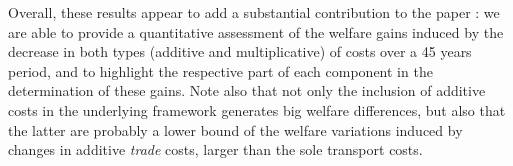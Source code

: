 \documentclass[a4paper,12pt]{article}
\begin{document}
Overall, these results appear to add a substantial contribution to the paper : we are able to provide a quantitative assessment of the welfare gains induced by the decrease in both types (additive and multiplicative) of costs over a 45 years period, and to highlight the respective part of each component in the determination of these gains. Note also that not only the inclusion of additive costs in the underlying framework generates big welfare differences, but also that the latter are probably a lower bound of the welfare variations induced by changes in additive \emph{trade} costs, larger than the sole transport costs.










\end{document}
